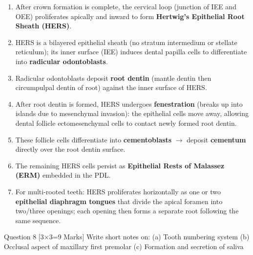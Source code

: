 \documentclass[11pt,a4paper]{article}
\begin{document}
\begin{ansbox}
\begin{enumerate}[leftmargin=*]
    \item After crown formation is complete, the cervical loop (junction of IEE and OEE) proliferates apically and inward to form \textbf{Hertwig's Epithelial Root Sheath (HERS)}.
    \item HERS is a bilayered epithelial sheath (no stratum intermedium or stellate reticulum); its inner surface (IEE) induces dental papilla cells to differentiate into \textbf{radicular odontoblasts}.
    \item Radicular odontoblasts deposit \textbf{root dentin} (mantle dentin then circumpulpal dentin of root) against the inner surface of HERS.
    \item After root dentin is formed, HERS undergoes \textbf{fenestration} (breaks up into islands due to mesenchymal invasion): the epithelial cells move away, allowing dental follicle ectomesenchymal cells to contact newly formed root dentin.
    \item These follicle cells differentiate into \textbf{cementoblasts} $\rightarrow$ deposit \textbf{cementum} directly over the root dentin surface.
    \item The remaining HERS cells persist as \textbf{Epithelial Rests of Malassez (ERM)} embedded in the PDL.
    \item For multi-rooted teeth: HERS proliferates horizontally as one or two \textbf{epithelial diaphragm tongues} that divide the apical foramen into two/three openings; each opening then forms a separate root following the same sequence.
\end{enumerate}
\end{ansbox}

\begin{qbox}{Question 8 [3$\times$3=9 Marks]}
Write short notes on: (a) Tooth numbering system \quad (b) Occlusal aspect of maxillary first premolar \quad (c) Formation and secretion of saliva
\end{qbox}
\end{document}
